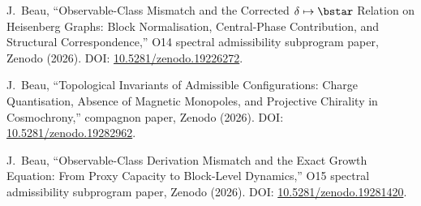 J.~Beau,
``Observable-Class Mismatch and the Corrected $\delta \mapsto \bstar$ Relation on Heisenberg Graphs:
Block Normalisation, Central-Phase Contribution,
and Structural Correspondence,''
O14 spectral admissibility subprogram paper, Zenodo (2026).
DOI: \href{https://doi.org/10.5281/zenodo.19226272}{10.5281/zenodo.19226272}.

J.~Beau,
``Topological Invariants of Admissible Configurations: Charge Quantisation, Absence of Magnetic Monopoles, and Projective Chirality in Cosmochrony,''
compagnon paper, Zenodo (2026).
DOI: \href{https://doi.org/10.5281/zenodo.19282962}{10.5281/zenodo.19282962}.

J.~Beau,
``Observable-Class Derivation Mismatch and the Exact Growth Equation: From Proxy Capacity to Block-Level Dynamics,''
O15 spectral admissibility subprogram paper, Zenodo (2026).
DOI: \href{https://doi.org/10.5281/zenodo.19281420}{10.5281/zenodo.19281420}.
